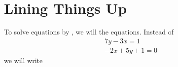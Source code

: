 \section{Lining Things Up}

To solve equations by , 
we will  the equations.
Instead of
%
\begin{align*}
    &7y - 3x = 1 \\
    &-2x + 5y + 1 = 0
\end{align*}
%
we will write


